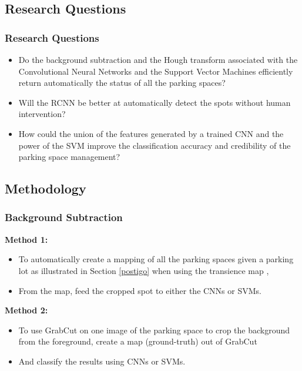 \documentclass{beamer}
\begin{document}
\subsection{Research Questions}

\begin{frame}
\frametitle{Research Questions}
\begin{itemize}
	\item Do the background subtraction and the Hough transform associated with the Convolutional Neural Networks and the Support Vector Machines efficiently return automatically the status of all the parking spaces?
	\item Will the RCNN be better at automatically detect the spots without human intervention?
	\item How could the union of the features generated by a trained CNN and the power of the SVM improve the classification accuracy and credibility of the parking space management? 
\end{itemize}
\end{frame}

\subsection{Methodology}

\begin{frame}
\frametitle{Background Subtraction}
\textbf{Method 1:} 
\begin{itemize}
	\item To automatically create a mapping of all the parking spaces given a parking lot as illustrated in Section \ref{postigo} when using the transience map \cite{Postigo},
	\item From the map, feed the cropped spot to either the CNNs or SVMs.
\end{itemize}

\textbf{Method 2:}
\begin{itemize}
	\item To use GrabCut on one image of the parking space to crop the background from the foreground, create a map (ground-truth) out of GrabCut
	\item And classify the results using CNNs or SVMs. 
\end{itemize}  
\end{frame}
\end{document}
